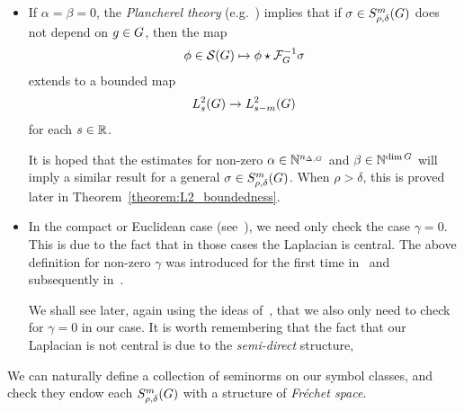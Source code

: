 \begin{itemize}
    \item If $\alpha = \beta = 0$,
        the \emph{Plancherel theory} (e.g.~\cite[Theorem 1.8.11]{FischerRuzhansky16}) implies that
        if $\sigma \in S^{m}_{\rho, \delta}(G)$ does not depend on $g \in G$,
        then the map
        \begin{align*}
            \phi \in {\mathcal{S} (G)} \mapsto \phi \star \mathcal{F}^{-1}_{G} \sigma
        \end{align*}
        extends to a bounded map
        \begin{align*}
            L^2_{s}(G) \to L^2_{s - m}(G)
        \end{align*}
        for each $s \in \mathbb{R}$.

        It is hoped that the estimates for non-zero $\alpha \in \mathbb{N}^{n_{\Delta, G}}$ and $\beta \in \mathbb{N}^{\dim G}$
        will imply a similar result for a general $\sigma \in S^{m}_{\rho, \delta}(G)$.
        When $\rho > \delta$,
        this is proved later in Theorem~\ref{theorem:L2_boundedness}.
    \item
        In the compact or Euclidean case (see~\cite{RuzhanskyTurunen10}),
        we need only check the case $\gamma = 0$.
        This is due to the fact that in those cases the Laplacian is central.
        The above definition for non-zero $\gamma$ was introduced for the first time in~\cite[Section 3.4]{FischerRuzhansky12} and subsequently in~\cite[Section 5.2]{FischerRuzhansky16}.

        We shall see later, again using the ideas of~\cite{FischerRuzhansky16},
        that we also only need to check for $\gamma = 0$ in our case.
        It is worth remembering that the fact that our Laplacian is not central
        is due to the \emph{semi-direct} structure,
\end{itemize}

We can naturally define a collection of seminorms on our symbol classes,
and check they endow each $S^{m}_{\rho, \delta}(G)$ with a structure of \emph{Fr\'echet space}.


